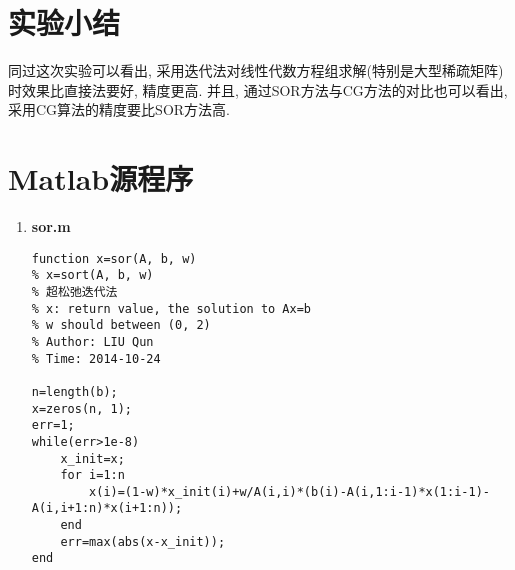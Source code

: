 \documentclass[a4paper]{article}
\begin{document}
\begin{CJK*}{GBK}{song}
\begin{center}
\begin{table*}[!htbp]
%
\end{table*}
\end{center}
\section{实验小结}
同过这次实验可以看出, 采用迭代法对线性代数方程组求解(特别是大型稀疏矩阵)时效果比直接法要好, 精度更高. 并且, 通过SOR方法与CG方法的对比也可以看出, 采用CG算法的精度要比SOR方法高.



\section{Matlab源程序}
\begin{enumerate}[(1)]
\item \textbf{sor.m} \\
\begin{lstlisting}
function x=sor(A, b, w)
% x=sort(A, b, w)
% 超松弛迭代法
% x: return value, the solution to Ax=b
% w should between (0, 2)
% Author: LIU Qun
% Time: 2014-10-24

n=length(b);
x=zeros(n, 1);
err=1;
while(err>1e-8)
    x_init=x;
    for i=1:n
        x(i)=(1-w)*x_init(i)+w/A(i,i)*(b(i)-A(i,1:i-1)*x(1:i-1)-A(i,i+1:n)*x(i+1:n));
    end
    err=max(abs(x-x_init));
end
\end{lstlisting}




\end{enumerate}
\end{CJK*}
\end{document}
